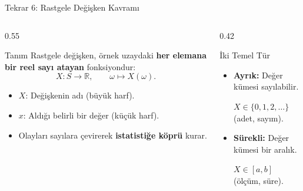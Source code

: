 \documentclass[light]{lutbeamer}
\begin{document}
\begin{frame}{Tekrar 6: Rastgele Değişken Kavramı}
    \begin{columns}[T]
        \begin{column}{0.55\textwidth}
            \begin{block}{Tanım}
                Rastgele değişken, örnek uzaydaki \textbf{her elemana bir reel sayı atayan} fonksiyondur:
                \[
                X : S \to \mathbb{R}, \qquad \omega \mapsto X(\omega).
                \]
            \end{block}

            \begin{itemize}
                \item $X$: Değişkenin adı (büyük harf).
                \item $x$: Aldığı belirli bir değer (küçük harf).
                \item Olayları sayılara çevirerek \textbf{istatistiğe köprü} kurar.
            \end{itemize}
        \end{column}
        \begin{column}{0.42\textwidth}
            \begin{exampleblock}{İki Temel Tür}
                \begin{itemize}
                    \item \textbf{Ayrık:} Değer kümesi sayılabilir.

                    $X \in \{0,1,2,\dots\}$ (adet, sayım).
                    \item \textbf{Sürekli:} Değer kümesi bir aralık.

                    $X \in [a,b]$ (ölçüm, süre).
                \end{itemize}
            \end{exampleblock}
        \end{column}
    \end{columns}
\end{frame}
\end{document}
